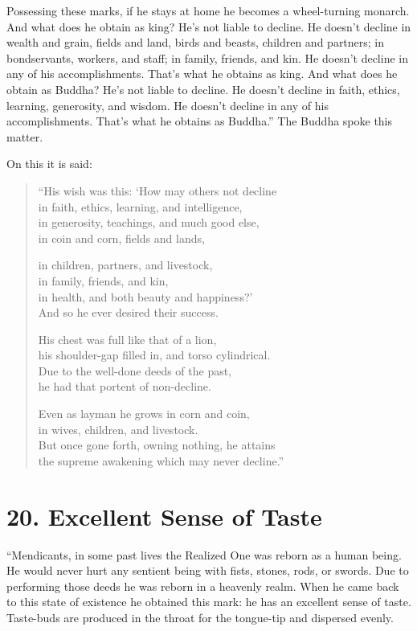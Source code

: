 \documentclass[12pt,openany]{book}%
\begin{document}
Possessing these marks, if he stays at home he becomes a wheel-turning monarch. And what does he obtain as king? He’s not liable to decline. He doesn’t decline in wealth and grain, fields and land, birds and beasts, children and partners; in bondservants, workers, and staff; in family, friends, and kin. He doesn’t decline in any of his accomplishments. That’s what he obtains as king. And what does he obtain as Buddha? He’s not liable to decline. He doesn’t decline in faith, ethics, learning, generosity, and wisdom. He doesn’t decline in any of his accomplishments. That’s what he obtains as Buddha.” The Buddha spoke this matter. 

On this it is said: 

\begin{verse}%
“His wish was this: ‘How may others not decline \\
in faith, ethics, learning, and intelligence, \\
in generosity, teachings, and much good else, \\
in coin and corn, fields and lands, 

in children, partners, and livestock, \\
in family, friends, and kin, \\
in health, and both beauty and happiness?’ \\
And so he ever desired their success. 

His chest was full like that of a lion, \\
his shoulder-gap filled in, and torso cylindrical. \\
Due to the well-done deeds of the past, \\
he had that portent of non-decline. 

Even as layman he grows in corn and coin, \\
in wives, children, and livestock. \\
But once gone forth, owning nothing, he attains \\
the supreme awakening which may never decline.” 

%
\end{verse}

\section*{20. Excellent Sense of Taste }

“Mendicants, in some past lives the Realized One was reborn as a human being. He would never hurt any sentient being with fists, stones, rods, or swords. Due to performing those deeds he was reborn in a heavenly realm. When he came back to this state of existence he obtained this mark: he has an excellent sense of taste. Taste-buds are produced in the throat for the tongue-tip and dispersed evenly. 
\end{document}
